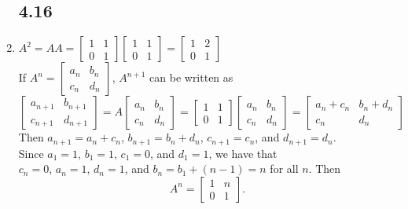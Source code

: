 \documentclass[a4paper, 12pt]{article}
\begin{document}
\begin{enumerate}
		\subsection*{4.16}
		\setcounter{enumi}{5}
		\item $A^2 = AA = \left[ \begin{array}{cc}
		1 & 1 \\
		0 & 1 \end{array} \right]
		\left[ \begin{array}{cc}
		1 & 1 \\
		0 & 1 \end{array} \right]
		= \left[ \begin{array}{cc}
		1 & 2 \\
		0 & 1 \end{array} \right]$ \\
		If $A^n = \left[ \begin{array}{cc}
		a_n & b_n \\
		c_n & d_n \end{array} \right]$,
		$A^{n + 1}$ can be written as
		\[ \left[ \begin{array}{cc}
		a_{n + 1} & b_{n + 1} \\
		c_{n + 1} & d_{n + 1} \end{array} \right]
		= A\left[ \begin{array}{cc}
		a_n & b_n \\
		c_n & d_n \end{array} \right]
		= \left[ \begin{array}{cc}
		1 & 1 \\
		0 & 1 \end{array} \right]
		\left[ \begin{array}{cc}
		a_n & b_n \\
		c_n & d_n \end{array} \right]
		= \left[ \begin{array}{cc}
		a_n + c_n & b_n + d_n \\
		c_n & d_n \end{array} \right]
		\]
		Then $a_{n + 1} = a_n + c_n$, $b_{n + 1} = b_n + d_n$, $c_{n + 1} = c_n$, and $d_{n + 1} = d_n$. \\
		Since $a_1 = 1$, $b_1 = 1$, $c_1 = 0$, and $d_1 = 1$, we have that \\
		$c_n = 0$, $a_n = 1$, $d_n = 1$, and $b_n = b_1 + (n - 1) = n$ for all $n$. Then
		\[ A^n = \left[ \begin{array}{cc}
		1 & n \\
		0 & 1 \end{array} \right]. \]
		

\end{enumerate}
\end{document}
